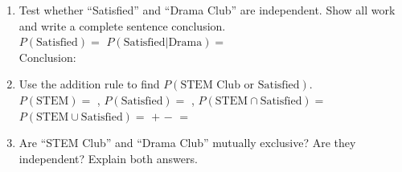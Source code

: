 \documentclass[10pt]{article}
\begin{document}
\begin{tcolorbox}[colback=sky, colframe=navy, boxrule=0.9pt, arc=2mm,
    left=3mm, right=3mm, top=2mm, bottom=2mm,
    title={\bfseries\small Tier A --- Approaching Proficiency: Compute and Interpret},
    fonttitle=\small]
\small
\begin{enumerate}[leftmargin=1.5em, itemsep=10pt]
  \item Test whether ``Satisfied'' and ``Drama Club'' are independent. Show all work
        and write a complete sentence conclusion.\\
        $P(\text{Satisfied}) = $ \blank{3cm} \quad $P(\text{Satisfied}|\text{Drama}) = $ \blank{3cm}\\
        Conclusion: \writeline\writeline

  \item Use the addition rule to find $P(\text{STEM Club or Satisfied})$.\\
        $P(\text{STEM}) = $ \blank{2cm}, $P(\text{Satisfied}) = $ \blank{2cm},
        $P(\text{STEM} \cap \text{Satisfied}) = $ \blank{2cm}\\
        $P(\text{STEM} \cup \text{Satisfied}) = $ \blank{2cm} $+$ \blank{2cm} $-$ \blank{2cm} $=$ \blank{2cm}

  \item Are ``STEM Club'' and ``Drama Club'' mutually exclusive? Are they independent?
        Explain both answers.\\
        \writeline\writeline\writeline
\end{enumerate}
\end{tcolorbox}

\vspace{0.1in}
\end{document}
